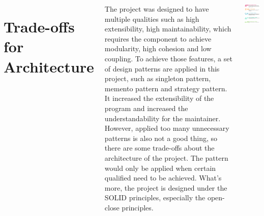 \documentclass[20pt,margin=1in,innermargin=-4.5in,blockverticalspace=-0.25in]{tikzposter}
\begin{document}
\begin{columns}
{    \section{ Trade-offs for Architecture }
    
 The project was designed to have multiple qualities such as high extensibility, high maintainability, which requires the component to achieve modularity, high cohesion and low coupling. To achieve those features, a set of design patterns are applied in this project, such as singleton pattern, memento pattern and strategy pattern. It increased the extensibility of the program and increased the understandability for the maintainer. However, applied too many unnecessary patterns is also not a good thing, so there are some trade-offs about the architecture of the project. The pattern would only be applied when certain qualified need to be achieved. What's more, the project is designed under the SOLID principles, especially the open-close principles. 
               \begin{tikzfigure}
            \includegraphics[width=0.5\linewidth]{assets/solid-principle.png}
        \end{tikzfigure}
       }
\end{columns}
\end{document}
